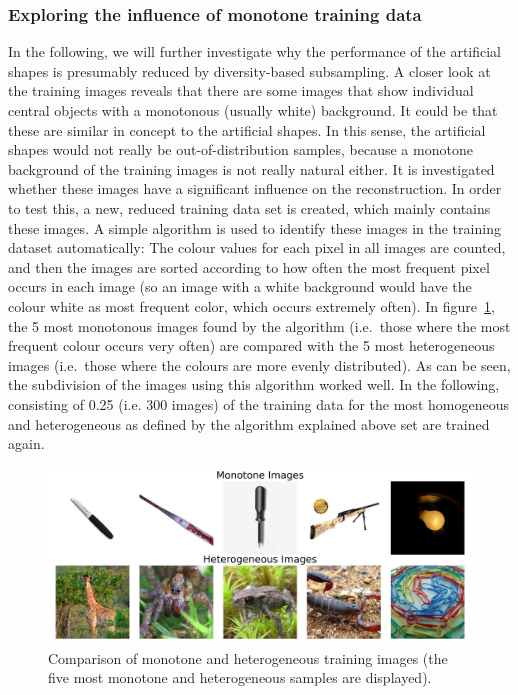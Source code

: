 \subsubsection{Exploring the influence of monotone training data}
In the following, we will further investigate why the performance of the artificial shapes is presumably reduced by diversity-based subsampling. A closer look at the training images reveals that there are some images that show individual central objects with a monotonous (usually white) background. It could be that these are similar in concept to the artificial shapes. In this sense, the artificial shapes would not really be out-of-distribution samples, because a monotone background of the training images is not really natural either. It is investigated whether these images have a significant influence on the reconstruction. In order to test this, a new, reduced training data set is created, which mainly contains these images. A simple algorithm is used to identify these images in the training dataset automatically: The colour values for each pixel in all images are counted, and then the images are sorted according to how often the most frequent pixel occurs in each image (so an image with a white background would have the colour white as most frequent color, which occurs extremely often). In figure~\ref{fig:dropout_discussion_monohetero_qual}, the 5 most monotonous images found by the algorithm (i.e.\ those where the most frequent colour occurs very often) are compared with the 5 most heterogeneous images (i.e.\ those where the colours are more evenly distributed). As can be seen, the subdivision of the images using this algorithm worked well. In the following,  consisting of 0.25 (i.e. 300 images) of the training data for the most homogeneous and heterogeneous as defined by the algorithm explained above set are trained again.


\begin{figure}[ht]
  \centering
  \includegraphics[width=1\textwidth]{plots/dropout_discussion_monohetero_qual.jpeg}
  \caption[Monotone and heterogeneous samples in the training dataset]{Comparison of monotone and heterogeneous training images (the five most monotone and heterogeneous samples are displayed).}\label{fig:dropout_discussion_monohetero_qual}
\end{figure}

